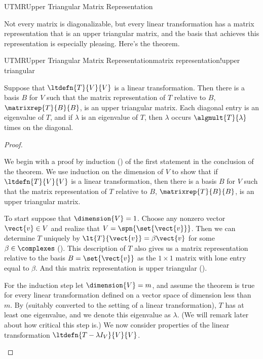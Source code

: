 %
\begin{subsect}{UTMR}{Upper Triangular Matrix Representation}
%
\begin{para}Not every matrix is diagonalizable, but every linear transformation has a matrix representation that is an upper triangular matrix, and the basis that achieves this representation is especially pleasing.  Here's the theorem.\end{para}
%
\begin{theorem}{UTMR}{Upper Triangular Matrix Representation}{matrix representation!upper triangular}
\begin{para}Suppose that $\ltdefn{T}{V}{V}$ is a linear transformation.  Then there is a basis $B$ for $V$ such that the matrix representation of $T$ relative to $B$, $\matrixrep{T}{B}{B}$, is an upper triangular matrix.  Each diagonal entry is an eigenvalue of $T$, and if $\lambda$ is an eigenvalue of $T$, then $\lambda$ occurs $\algmult{T}{\lambda}$ times on the diagonal.\end{para}
\end{theorem}
%
\begin{proof}
\begin{para}We begin with a proof by induction () of the first statement in the conclusion of the theorem.  We use induction on the dimension of $V$ to show that if $\ltdefn{T}{V}{V}$ is a linear transformation,  then there is a basis $B$ for $V$ such that the matrix representation of $T$ relative to $B$, $\matrixrep{T}{B}{B}$, is an upper triangular matrix.\end{para}
%
\begin{para}To start suppose that $\dimension{V}=1$.  Choose any nonzero vector $\vect{v}\in V$ and realize that $V=\spn{\set{\vect{v}}}$.  Then we can determine $T$ uniquely by $\lt{T}{\vect{v}}=\beta\vect{v}$ for some $\beta\in\complexes$ ().  This description of $T$ also gives us a matrix representation relative to the  basis $B=\set{\vect{v}}$ as the $1\times 1$ matrix with lone entry equal to $\beta$.  And this matrix representation is upper triangular ().\end{para}
%
\begin{para}For the induction step let $\dimension{V}=m$, and assume the theorem is true for every linear transformation defined on a vector space of dimension less than $m$.  By  (suitably converted to the setting of a linear transformation), $T$ has at least one eigenvalue, and we denote this eigenvalue as $\lambda$.  (We will remark later about how critical this step is.)  We now consider properties of the linear transformation $\ltdefn{T-\lambda I_V}{V}{V}$.\end{para}

\end{proof}
\end{subsect}
